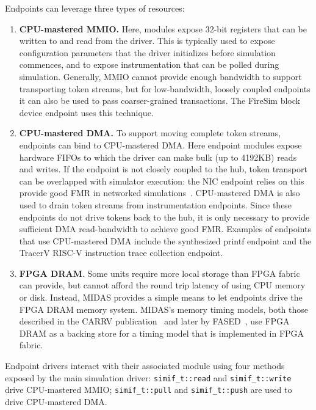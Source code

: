 Endpoints can leverage three types of resources:

\begin{enumerate}
\item \textbf{CPU-mastered MMIO.} Here, modules expose 32-bit registers that can be
    written to and read from the driver. This is typically used to expose
    configuration  parameters that the driver initializes before simulation
    commences, and to expose instrumentation that can be polled during
    simulation. Generally, MMIO cannot provide enough bandwidth to support transporting token streams,
    but for low-bandwidth, loosely coupled endpoints it can also be used to pass coarser-grained transactions.
    The FireSim block device endpoint uses this technique.

\item \textbf{CPU-mastered DMA.} To support moving complete token streams, endpoints can
    bind to CPU-mastered DMA. Here endpoint modules expose hardware FIFOs to which the driver
    can make bulk (up to 4192KB) reads and writes. If the endpoint is not closely coupled
    to the hub, token transport can be overlapped with simulator execution: the NIC endpoint relies on this
    provide good FMR in networked simulations~\cite{FireSim}. CPU-mastered DMA is also used 
    to drain token streams from instrumentation endpoints. Since these endpoints do not drive
    tokens back to the hub, it is only necessary to provide sufficient DMA
    read-bandwidth to achieve good FMR.
    Examples of endpoints that use CPU-mastered DMA include the synthesized printf endpoint and the TracerV
    RISC-V instruction trace collection endpoint.

\item \textbf{FPGA DRAM}. Some units require more local storage than FPGA fabric can
    provide, but cannot afford the round trip latency of using CPU memory or
    disk. Instead, MIDAS provides a simple means to let endpoints drive the FPGA
    DRAM memory system.  MIDAS's memory timing models, both those described
    in the CARRV publication~\cite{MIDAS} and later by FASED~\cite{FASED},
    use FPGA DRAM as a backing store for a timing model that is implemented
    in FPGA fabric.
\end{enumerate}

Endpoint drivers interact with their associated module using four methods
exposed by the main simulation driver: \texttt{simif\_t::read} and
\texttt{simif\_t::write} drive CPU-mastered MMIO; \texttt{simif\_t::pull} and
\texttt{simif\_t::push} are used to drive CPU-mastered DMA.


